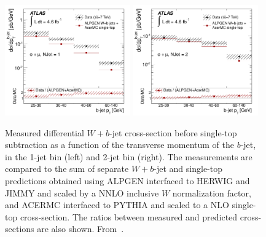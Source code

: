 \documentclass[11pt]{cernrep}
\begin{document}
\begin{figure}
\begin{center}
\includegraphics[width=0.48\textwidth]{fig_09a.pdf}
\includegraphics[width=0.48\textwidth]{fig_09b.pdf}
\caption{\label{fig:wb}
Measured differential $W+b$-jet cross-section before single-top subtraction as a function of the transverse momentum of the $b$-jet, in the 
1-jet bin (left) and 2-jet bin (right). 
The measurements are compared to the sum of separate $W+b$-jet and single-top predictions 
obtained using ALPGEN interfaced to HERWIG and JIMMY and scaled by a NNLO inclusive $W$ normalization factor, and ACERMC interfaced to PYTHIA and scaled to a 
NLO single-top cross-section. 
The ratios between measured and predicted cross-sections are also shown. From~\protect\cite{Aad:2013vka}.}
\end{center}
\end{figure}
\end{document}
